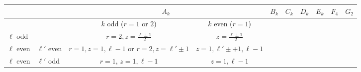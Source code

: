\documentclass{amsart}
\begin{document}
\begin{tabular}{l|l||c|c|c|c|c|c|c|c}
            &              & \multicolumn{2}{|c|}{$A_k$}                                      & $B_k$ & $C_k$ & $D_k$ & $E_k$ & $F_4$ & $G_2$ \\
\hline
            &              & $k$ odd ($r=1$ or $2$) & $k$ even ($r=1$)                        &       &       &       &       &       &       \\
\hline\hline
$\ell$ odd  &              & $r=2,z=\frac{\ell\pm1}{2}$ & $z=\frac{\ell\pm1}{2}$              &       &       &       &       &       &       \\
\hline
$\ell$ even & $\ell'$ even & $r=1,z=1,\ell-1$ or $r=2, z=\ell'\pm1$ & $z=1,\ell'\pm+1,\ell-1$ &&&&&& \\
\hline
$\ell$ even & $\ell'$ odd  & $r=1$, $z=1,\ell-1$ & $z=1,\ell-1$                               &&&&&&
\end{tabular}
\end{document}
